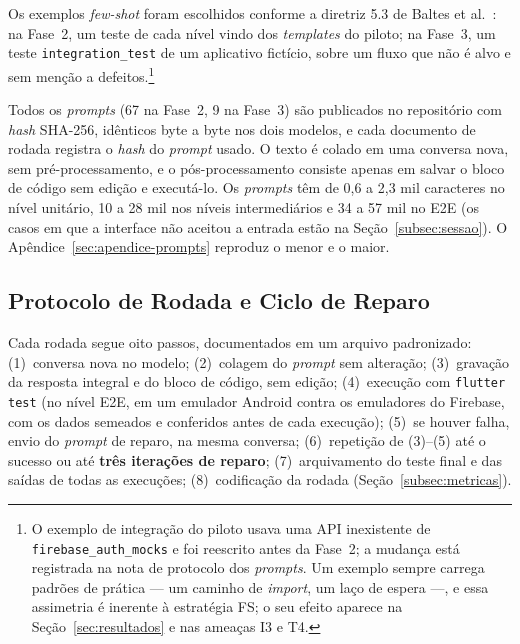 \documentclass[12pt]{article}
\begin{document}
Os exemplos \textit{few-shot} foram escolhidos conforme a diretriz 5.3 de
Baltes et al.~\cite{baltes2026guidelines}: na Fase~2, um teste de cada nível
vindo dos \textit{templates} do piloto; na Fase~3, um teste
\texttt{integration\_test} de um aplicativo fictício, sobre um fluxo que não
é alvo e sem menção a defeitos.\footnote{O exemplo de integração do piloto
usava uma API inexistente de \texttt{firebase\_auth\_mocks} e foi reescrito
antes da Fase~2; a mudança está registrada na nota de protocolo dos
\textit{prompts}. Um exemplo sempre carrega padrões de prática --- um
caminho de \textit{import}, um laço de espera ---, e essa assimetria é
inerente à estratégia FS; o seu efeito aparece na Seção~\ref{sec:resultados}
e nas ameaças I3 e T4.}

Todos os \textit{prompts} (67 na Fase~2, 9 na Fase~3) são publicados no
repositório com \textit{hash} SHA-256, idênticos byte a byte nos dois
modelos, e cada documento de rodada registra o \textit{hash} do
\textit{prompt} usado. O texto é colado em uma conversa nova, sem
pré-processamento, e o pós-processamento consiste apenas em salvar o bloco de
código sem edição e executá-lo. Os \textit{prompts} têm de 0,6 a 2,3 mil
caracteres no nível unitário, 10 a 28 mil nos níveis intermediários e 34 a
57 mil no E2E (os casos em que a interface não aceitou a entrada estão na
Seção~\ref{subsec:sessao}). O Apêndice~\ref{sec:apendice-prompts} reproduz
o menor e o maior.

\subsection{Protocolo de Rodada e Ciclo de Reparo}
\label{subsec:protocolo}

Cada rodada segue oito passos, documentados em um arquivo padronizado:
(1)~conversa nova no modelo; (2)~colagem do \textit{prompt} sem alteração;
(3)~gravação da resposta integral e do bloco de código, sem edição;
(4)~execução com \texttt{flutter test} (no nível E2E, em um emulador Android
contra os emuladores do Firebase, com os dados semeados e conferidos antes
de cada execução); (5)~se houver falha, envio do \textit{prompt} de reparo,
na mesma conversa; (6)~repetição de (3)--(5) até o sucesso ou até
\textbf{três iterações de reparo}; (7)~arquivamento do teste final e das
saídas de todas as execuções; (8)~codificação da rodada
(Seção~\ref{subsec:metricas}).
\end{document}
